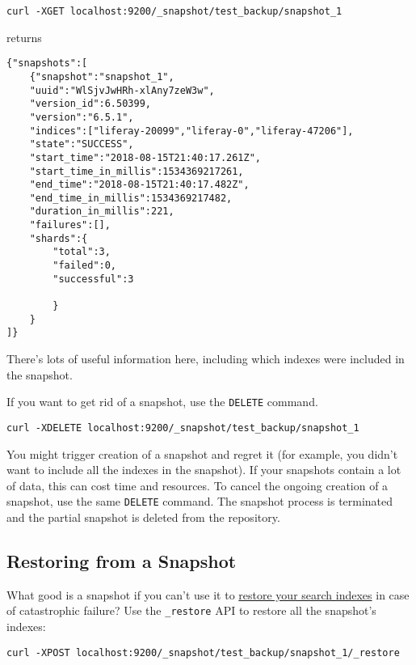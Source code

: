 \begin{verbatim}
curl -XGET localhost:9200/_snapshot/test_backup/snapshot_1
\end{verbatim}

returns

\begin{verbatim}
{"snapshots":[
    {"snapshot":"snapshot_1",
    "uuid":"WlSjvJwHRh-xlAny7zeW3w",
    "version_id":6.50399,
    "version":"6.5.1",
    "indices":["liferay-20099","liferay-0","liferay-47206"],
    "state":"SUCCESS",
    "start_time":"2018-08-15T21:40:17.261Z",
    "start_time_in_millis":1534369217261,
    "end_time":"2018-08-15T21:40:17.482Z",
    "end_time_in_millis":1534369217482,
    "duration_in_millis":221,
    "failures":[],
    "shards":{
        "total":3,
        "failed":0,
        "successful":3
        
        }
    }
]}
\end{verbatim}

There's lots of useful information here, including which indexes were
included in the snapshot.

If you want to get rid of a snapshot, use the \texttt{DELETE} command.

\begin{verbatim}
curl -XDELETE localhost:9200/_snapshot/test_backup/snapshot_1
\end{verbatim}

You might trigger creation of a snapshot and regret it (for example, you
didn't want to include all the indexes in the snapshot). If your
snapshots contain a lot of data, this can cost time and resources. To
cancel the ongoing creation of a snapshot, use the same \texttt{DELETE}
command. The snapshot process is terminated and the partial snapshot is
deleted from the repository.

\subsection{Restoring from a Snapshot}\label{restoring-from-a-snapshot}

What good is a snapshot if you can't use it to
\href{https://www.elastic.co/guide/en/elasticsearch/reference/6.5/modules-snapshots.html\#_restore}{restore
your search indexes} in case of catastrophic failure? Use the
\texttt{\_restore} API to restore all the snapshot's indexes:

\begin{verbatim}
curl -XPOST localhost:9200/_snapshot/test_backup/snapshot_1/_restore
\end{verbatim}

